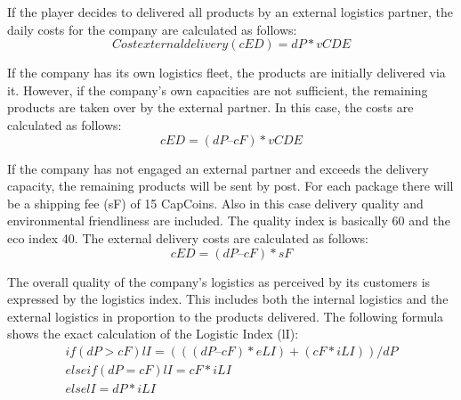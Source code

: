If the player decides to delivered all products by an external logistics partner, the daily costs for the company are calculated as follows:
\begin{equation}
\label{func:costExternalDelivery_all}
    Cost external delivery (cED) = dP * vCDE
\end{equation}

If the company has its own logistics fleet, the products are initially delivered via it. However, if the company's own capacities are not sufficient, the remaining products are taken over by the external partner. In this case, the costs are calculated as follows: 
\begin{equation}
\label{func:costExternalDelivery_partly}
    cED = ( dP – cF ) * vCDE
\end{equation}

If the company has not engaged an external partner and exceeds the delivery capacity, the remaining products will be sent by post. For each package there will be a shipping fee (\gls{sF}) of 15 CapCoins. Also in this case delivery quality and environmental friendliness are included. The quality index is basically 60 and the eco index 40. The external delivery costs are calculated as follows:  
\begin{equation}
\label{func:costExternalDelivery_post}
    cED = ( dP – cF ) * sF
\end{equation}

The overall quality of the company's logistics as perceived by its customers is expressed by the logistics index. This includes both the internal logistics and the external logistics in proportion to the products delivered. The following formula shows the exact calculation of the Logistic Index (\gls{lI}):
\begin{equation}
\label{func:logisticIndex}
\begin{aligned}
    if ( dP > cF ) lI = { ((( dP – cF) * eLI ) + ( cF * iLI )) / dP} \\
    elseif ( dP = cF ) lI = { cF * iLI } \\
    else lI = { dP * iLI }  
\end{aligned}
\end{equation}